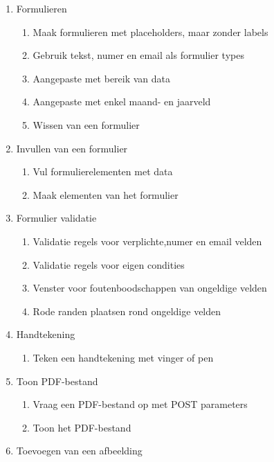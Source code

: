\begin{enumerate}[label*=U \arabic*.]
\item \label{challenge:formulieren}Formulieren
\begin{enumerate}[label*=\arabic*]
\item Maak formulieren met placeholders,  maar zonder labels
\item Gebruik tekst, numer en email als formulier types
\item Aangepaste  met bereik van data
\item Aangepaste  met enkel maand- en jaarveld
\item Wissen van een formulier
\end{enumerate}
\item \label{challenge:invullen}Invullen van een formulier
\begin{enumerate}[label*=\arabic*]
\item Vul formulierelementen met data
\item Maak elementen van het formulier 
\end{enumerate}
\item \label{challenge:validatie}Formulier validatie
\begin{enumerate}[label*=\arabic*]
\item Validatie regels voor verplichte,numer en email velden
\item Validatie regels voor eigen condities
\item Venster voor foutenboodschappen van ongeldige velden
\item Rode randen plaatsen rond ongeldige velden
\end{enumerate}
\item \label{challenge:handtekening}Handtekening
\begin{enumerate}[label*=\arabic*]
\item Teken een handtekening met vinger of pen
\end{enumerate}
\item \label{challenge:pdf}Toon PDF-bestand
\begin{enumerate}[label*=\arabic*]
\item Vraag een PDF-bestand op met POST parameters
\item Toon het PDF-bestand
\end{enumerate}
\item \label{challenge:afbeelding}Toevoegen van een afbeelding

\end{enumerate}
